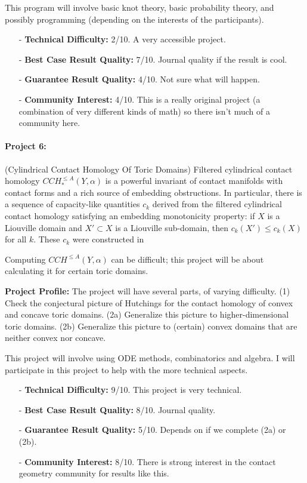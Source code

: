 \documentclass[12pt]{article}
\numberwithin{equation}{section}
\theoremstyle{definition}
\begin{document}
This program will involve basic knot theory, basic probability theory, and possibly programming (depending on the interests of the participants). 

\begin{itemize}
	\item[-] {\bf Technical Difficulty:} 2/10. A very accessible project.
	\item[-] {\bf Best Case Result Quality:} 7/10. Journal quality if the result is cool.
	\item[-] {\bf Guarantee Result Quality:} 4/10. Not sure what will happen.
	\item[-] {\bf Community Interest:} 4/10. This is a really original project (a combination of very different kinds of math) so there isn't much of a community here.
\end{itemize}

\paragraph{Project 6:} (Cylindrical Contact Homology Of Toric Domains) Filtered cylindrical contact homology $CCH^{\le A}_*(Y,\alpha)$ is a powerful invariant of contact manifolds with contact forms and a rich source of embedding obstructions. In particular, there is a sequence of capacity-like quantities $c_k$ derived from the filtered cylindrical contact homology satisfying an embedding monotonicity property: if $X$ is a Liouville domain and $X' \subset X$ is a Liouville sub-domain, then $c_k(X') \le c_k(X)$ for all $k$. These $c_k$ were constructed in \cite{gh2017}

Computing $CCH^{\le A}(Y,\alpha)$ can be difficult; this project will be about calculating it for certain toric domains. 

{\bf Project Profile:} The project will have several parts, of varying difficulty. (1) Check the conjectural picture of Hutchings for the contact homology of convex and concave toric domains. (2a) Generalize this picture to higher-dimensional toric domains. (2b) Generalize this picture to (certain) convex domains that are neither convex nor concave.

This project will involve using ODE methods, combinatorics and algebra. I will participate in this project to help with the more technical aspects.

\begin{itemize}
	\item[-] {\bf Technical Difficulty:} 9/10. This project is very technical.
	\item[-] {\bf Best Case Result Quality:} 8/10. Journal quality.
	\item[-] {\bf Guarantee Result Quality:} 5/10. Depends on if we complete (2a) or (2b).
	\item[-] {\bf Community Interest:} 8/10. There is strong interest in the contact geometry community for results like this.
\end{itemize}
\end{document}
